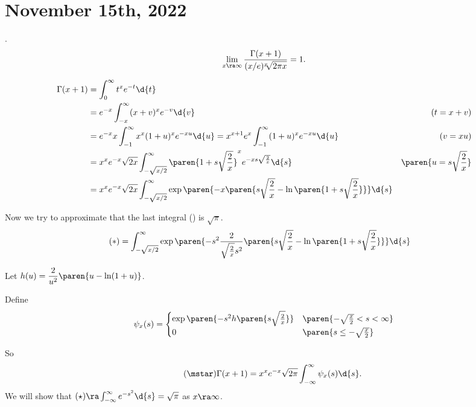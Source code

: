 \section*{November 15th, 2022}

\thm. 
\[
    \lim_{x \ra \infty} \frac{\Gamma(x+1)}{(x/e)^x \sqrt[]{2\pi x}} = 1.
\]

\pf
\[
    \begin{aligned}
        \Gamma(x + 1) & = \int_{0}^{\infty} t^x e^{-t} \d{t}                                                                                                                                         \\
                      & = e^{-x} \int_{-x}^{\infty} (x+v)^{x}e^{-v}\d{v}                                                                                          & (t = x+ v)                       \\
                      & = e^{-x} x \int_{-1}^\infty x^x (1 + u)^x e^{-xu} \d{u} = x^{x+1}e^x \int_{-1}^\infty (1+u)^x e^{-xu} \d{u}                               & (v = xu)                         \\
                      & = x^{x} e^{-x} \sqrt{2x}\int_{-\sqrt{x/2}}^{\infty} \paren{1 + s\sqrt{\frac{2}{x}}}^x e^{-xs\sqrt{\frac{2}{x}}} \d{s}                     & \paren{u = s \sqrt{\frac{2}{x}}} \\
                      & = x^{x} e^{-x} \sqrt{2x}\int_{-\sqrt{x/2}}^{\infty} \exp\paren{-x\paren{s\sqrt{\frac{2}{x}} - \ln\paren{1 + s\sqrt{\frac{2}{x}}} }} \d{s}
    \end{aligned}
\]

Now we try to approximate that the last integral (\mast) is \(\sqrt{\pi}\).
\[
    \begin{aligned}
        (\ast) & = \int_{-\sqrt{x/2}}^\infty \exp\paren{-s^2 \frac{2}{\sqrt{\frac{2}{x}}s^2} \paren{s \sqrt{\frac{2}{x}} - \ln\paren{1 + s\sqrt{\frac{2}{x}}}}} \d{s}
    \end{aligned}
\]

Let \(h(u) = \dfrac{2}{u^2} \paren{u - \ln(1+u)}\).

Define
\[
    \psi_x (s) = \begin{cases}
        \exp\paren{-s^2 h\paren{s\sqrt{\frac{2}{x}}}} & \paren{-\sqrt{\frac{x}{2}} < s < \infty} \\
        0                                             & \paren{s \leq -\sqrt{\frac{x}{2}}}
    \end{cases}
\]

So
\[ \tag{\mstar}
    \Gamma(x + 1) = x^x e^{-x} \sqrt{2\pi} \int_{-\infty}^\infty \psi_x(s) \d{s}.
\] We will show that \((\star) \ra \int_{-\infty}^\infty e^{-s^2}\d{s} = \sqrt{\pi}\) as \(x \ra \infty\).

